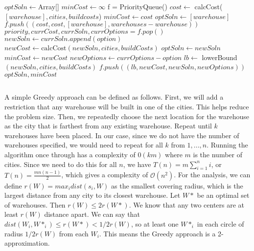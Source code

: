 \documentclass{article}
\begin{document}
\begin{algorithm}
\begin{algorithmic}[1]
	\State $optSoln \gets $Array[]
	\State $minCost \gets \infty$
	\State f = PriorityQueue()
		\State $cost \gets$ calcCost($[warehouse], cities, buildcosts$)
			\State $minCost \gets cost$
			\State $optSoln \gets [warehouse]$
		\EndIf
		\State $f.push((cost, cost, [warehouse], warehouses - warehouse))$
	\EndFor
		\State $priority, currCost, currSoln, currOptions = f.pop()$
			\State $newSoln \gets currSoln.append(option)$
			\State $newCost \gets \text{calcCost}(newSoln, cities, buildCosts)$
				\State $optSoln \gets newSoln$
				\State $minCost \gets newCost$
			\Else
				\State $newOptions \gets currOptions - option$
				\State $lb \gets $ lowerBound$(newSoln, cities, buildCosts)$
					\State $f.push((lb, newCost, newSoln, newOptions))$
				\EndIf
			\EndIf
		\EndFor
	\EndWhile
	\State \Return $optSoln, minCost$
\EndFunction
\end{algorithmic}
\end{algorithm}

\subsection{}

A simple Greedy approach can be defined as follows. First, we will add a restriction that any warehouse will be built in one of the cities. This helps reduce the problem size. Then, we repeatedly choose the next location for the warehouse as the city that is farthest from any existing warehouse. Repeat until $k$ warehouses have been placed. In our case, since we do not have the number of warehouses specified, we would need to repeat for all $k$ from $1,...,n$. Running the algorithm once through has a complexity of $\mathcal{0}(km)$ where $m$ is the number of cities. Since we need to do this for all $n$, we have $T(n) = m\sum_{i=1}^{n}i$, or $T(n)=\frac{mn(n-1)}{2}$, which gives a complexity of $\mathcal{O}(n^2)$. For the analysis, we can define $r(W)=max_i dist(s_i, W)$ as the smallest covering radius, which is the largest distance from any city to its closest warehouse. Let $W*$ be an optimal set of warehouses. Then $r(W) \leq 2r(W*)$. We know that any two centers are at least $r(W)$ distance apart. We can say that $dist(W_i, W*_i) \leq r(W*) < 1/2 r(W)$, so at least one $W*_i$ in each circle of radius $1/2 r(W)$ from each $W_i$. This means the Greedy approach is a 2-approximation.
\end{document}
